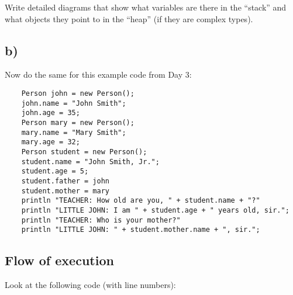 \documentclass{article}
\begin{document}
Write detailed diagrams that show what variables are there in the
``stack'' and what objects they point to in the ``heap'' (if they are
complex types). 

\subsection{b)}
\label{sec:bff}

Now do the same for this example code from Day 3:

\begin{verbatim}
    Person john = new Person();
    john.name = "John Smith";
    john.age = 35;
    Person mary = new Person();
    mary.name = "Mary Smith";
    mary.age = 32;
    Person student = new Person();
    student.name = "John Smith, Jr.";
    student.age = 5;
    student.father = john
    student.mother = mary
    println "TEACHER: How old are you, " + student.name + "?"
    println "LITTLE JOHN: I am " + student.age + " years old, sir.";
    println "TEACHER: Who is your mother?"
    println "LITTLE JOHN: " + student.mother.name + ", sir.";
\end{verbatim}

\subsection{Flow of execution}
\label{sec:flow-execution}

Look at the following code (with line numbers): 
\end{document}
